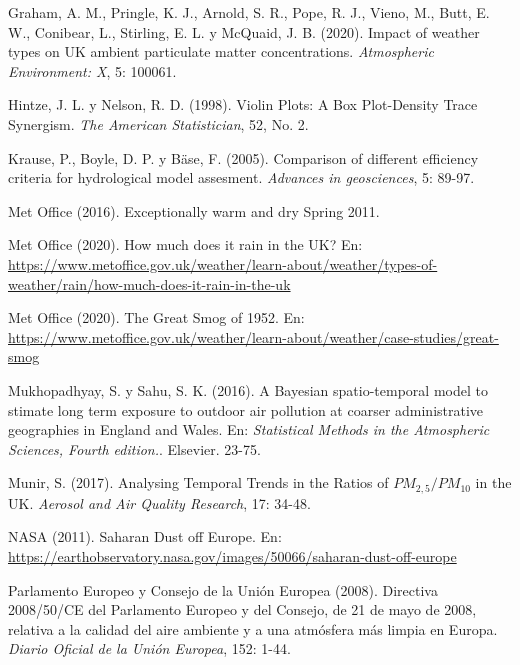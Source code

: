 \documentclass[12pt]{article}
\begin{document}
\begin{thebibliography}{99}
 Graham, A. M., Pringle, K. J., Arnold, S. R., Pope, R. J., Vieno, M., Butt, E. W., Conibear, L., Stirling, E. L. y McQuaid, J. B. (2020). Impact of weather types on UK ambient particulate matter concentrations. \textit{Atmospheric Environment: X}, 5: 100061. 

 Hintze, J. L. y Nelson, R. D. (1998). Violin Plots: A Box Plot-Density Trace Synergism. \textit{The American Statistician}, 52, No. 2.

 Krause, P., Boyle, D. P. y Bäse, F. (2005). Comparison of different efficiency criteria for hydrological model assesment. \textit{Advances in geosciences}, 5: 89-97.

 Met Office (2016). Exceptionally warm and dry Spring 2011.

 Met Office (2020). How much does it rain in the UK? En: \href{https://www.metoffice.gov.uk/weather/learn-about/weather/types-of-weather/rain/how-much-does-it-rain-in-the-uk}{https://www.metoffice.gov.uk/weather/learn-about/weather/types-of-weather/rain/how-much-does-it-rain-in-the-uk}

 Met Office (2020). The Great Smog of 1952. En: \href{https://www.metoffice.gov.uk/weather/learn-about/weather/case-studies/great-smog}{https://www.metoffice.gov.uk/weather/learn-about/weather/case-studies/great-smog}

 Mukhopadhyay, S. y Sahu, S. K. (2016). A Bayesian spatio-temporal model to stimate long term exposure to outdoor air pollution at coarser administrative geographies in England and Wales. En: \textit{Statistical Methods in the Atmospheric Sciences, Fourth edition.}. Elsevier. 23-75.

 Munir, S. (2017). Analysing Temporal Trends in the Ratios of $PM_{2,5}/PM_{10}$ in the UK. \textit{Aerosol and Air Quality Research}, 17: 34-48.

 NASA (2011). Saharan Dust off Europe. En: \href{https://earthobservatory.nasa.gov/images/50066/saharan-dust-off-europe}{https://earthobservatory.nasa.gov/images/50066/saharan-dust-off-europe}

 Parlamento Europeo y Consejo de la Unión Europea (2008). Directiva 2008/50/CE del Parlamento Europeo y del Consejo, de 21 de mayo de 2008, relativa a la calidad del aire ambiente y a una atmósfera más limpia en Europa. \textit{Diario Oficial de la Unión Europea}, 152: 1-44.


\end{thebibliography}
\end{document}
